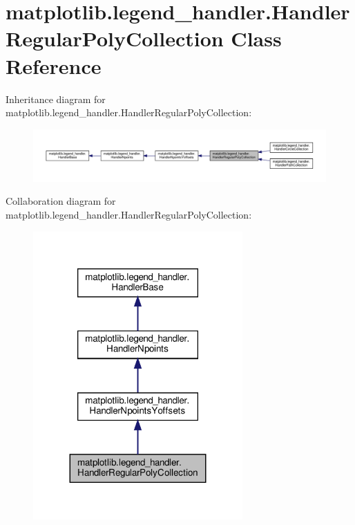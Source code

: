 \hypertarget{classmatplotlib_1_1legend__handler_1_1HandlerRegularPolyCollection}{}\section{matplotlib.\+legend\+\_\+handler.\+Handler\+Regular\+Poly\+Collection Class Reference}
\label{classmatplotlib_1_1legend__handler_1_1HandlerRegularPolyCollection}


Inheritance diagram for matplotlib.\+legend\+\_\+handler.\+Handler\+Regular\+Poly\+Collection\+:
\nopagebreak
\begin{figure}[H]
\begin{center}
\leavevmode
\includegraphics[width=350pt]{classmatplotlib_1_1legend__handler_1_1HandlerRegularPolyCollection__inherit__graph}
\end{center}
\end{figure}


Collaboration diagram for matplotlib.\+legend\+\_\+handler.\+Handler\+Regular\+Poly\+Collection\+:
\nopagebreak
\begin{figure}[H]
\begin{center}
\leavevmode
\includegraphics[width=227pt]{classmatplotlib_1_1legend__handler_1_1HandlerRegularPolyCollection__coll__graph}
\end{center}
\end{figure}
